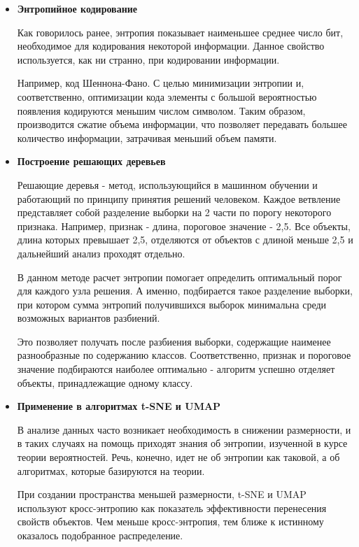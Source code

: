 \begin{itemize}
	\item \textbf{Энтропийное кодирование}
	
	Как говорилось ранее, энтропия показывает наименьшее среднее число бит, необходимое для кодирования некоторой информации. Данное свойство используется, как ни странно, при кодировании информации.
	
	Например, код Шеннона-Фано. С целью минимизации энтропии и, соответственно, оптимизации кода элементы с большой вероятностью появления кодируются меньшим числом символом. Таким образом, производится сжатие объема информации, что позволяет передавать большее количество информации, затрачивая меньший объем памяти.
	
	\item \textbf{Построение решающих деревьев}
	
	Решающие деревья - метод, использующийся в машинном обучении и работающий по принципу принятия решений человеком. Каждое ветвление представляет собой разделение выборки на 2 части по порогу некоторого признака. Например, признак - длина, пороговое значение -  2,5. Все объекты, длина которых превышает 2,5, отделяются от объектов с длиной меньше 2,5 и дальнейший анализ проходят отдельно.
	
	В данном методе расчет энтропии помогает определить оптимальный порог для каждого узла решения. А именно, подбирается такое разделение выборки, при котором сумма энтропий получившихся выборок минимальна среди возможных вариантов разбиений.
	
	Это позволяет получать после разбиения выборки, содержащие наименее разнообразные по содержанию классов. Соответственно, признак и пороговое значение подбираются наиболее оптимально - алгоритм успешно отделяет объекты, принадлежащие одному классу.
	
	\item \textbf{Применение в алгоритмах t-SNE и UMAP}
	
	В анализе данных часто возникает необходимость в снижении размерности, и в таких случаях на помощь приходят знания об энтропии, изученной в курсе теории вероятностей. Речь, конечно, идет не об энтропии как таковой, а об алгоритмах, которые базируются на теории.
	
	При создании пространства меньшей размерности, t-SNE и UMAP используют кросс-энтропию как показатель эффективности перенесения свойств объектов. Чем меньше кросс-энтропия, тем ближе к истинному оказалось подобранное распределение.
	
	
\end{itemize}